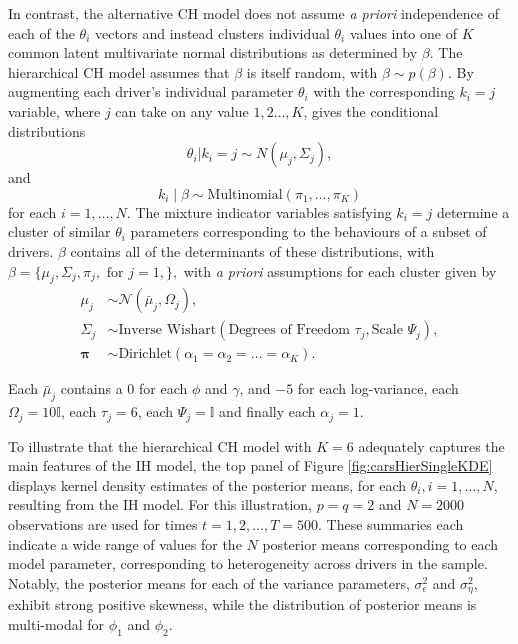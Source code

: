 \documentclass[
12pt, %
onehalfspacing, %
nohyperref, %
headsepline, %
chapterinoneline, %
]{MastersDoctoralThesis} %
\begin{document}
In contrast, the alternative CH model does not assume \textit{a priori} independence of each of the $\theta_i$ vectors and instead clusters individual $\theta_i$ values into one of $K$ common latent multivariate normal distributions as determined by $\beta.$ The hierarchical CH model assumes that $\beta$ is itself random, with $\beta \sim p(\beta)$. By augmenting each driver's individual parameter $\theta_i$ with the corresponding $k_i=j$ variable, where $j$ can take on any value $1,2 \ldots, K$, gives the conditional distributions
\begin{equation}
\label{cars:mixPrior}
\theta_i | k_i = j \sim N(\mu_j, \Sigma_j),
\end{equation}
and
\begin{equation}
k_i \mid \beta \sim \mbox{Multinomial}\left(\pi_1, \ldots, \pi_{K}\right)
\end{equation}
for each $i = 1, \ldots, N$. The mixture indicator variables satisfying $k_i=j$ determine a cluster of similar $\theta_i$ parameters corresponding to the behaviours of a subset of drivers. $\beta$ contains all of the determinants of these distributions, with $\beta = \{\mu_j,\Sigma_j, \pi_j, \mbox{ for } j=1,\},$ with \textit{a priori} assumptions for each cluster given by  
\begin{align}
\mu_j &\sim \mathcal{N}\left(\bar{\mu}_j, \Omega_j\right), \\
\Sigma_j &\sim \mbox{Inverse Wishart}\left(\mbox{Degrees of Freedom } \tau_j, \mbox{Scale } \Psi_j\right), \\
\boldsymbol{\pi} &\sim \mbox{Dirichlet}\left(\alpha_1 = \alpha_2 = \ldots = \alpha_K\right).
\end{align}

Each $\bar{\mu}_j$ contains a $0$ for each $\phi$ and $\gamma$, and $-5$ for each log-variance, each $\Omega_j = 10 \mathbb{I}$, each $\tau_j = 6$, each $\Psi_j = \mathbb{I}$ and finally each $\alpha_j = 1$. 

To illustrate that the hierarchical CH model with $K=6$ adequately captures the main features of the IH model, the top panel of Figure \ref{fig:carsHierSingleKDE} displays kernel density estimates of the posterior means, for each $\theta_i, i = 1, \ldots, N$, resulting from the IH model. For this illustration, $p = q = 2$ and $N=2000$ observations are used for times $t=1, 2, \ldots, T = 500$. These summaries each indicate a wide range of values for the $N$ posterior means corresponding to each model parameter, corresponding to heterogeneity across drivers in the sample. Notably, the posterior means for each of the variance parameters, $\sigma^2_{\epsilon}$ and $\sigma^2_{\eta}$, exhibit strong positive skewness, while the distribution of posterior means is multi-modal for $\phi_1$ and $\phi_2$. 
\end{document}
